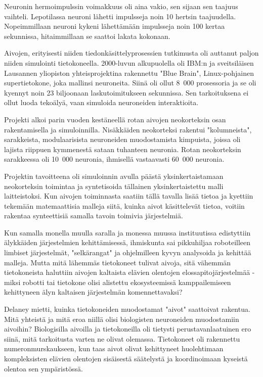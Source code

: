 Neuronin hermoimpulssin voimakkuus oli aina vakio, sen sijaan sen taajuus vaihteli. Lepotilassa neuroni lähetti impulsseja noin 10 hertsin taajuudella. Nopeimmillaan neuroni kykeni lähettämään impulsseja noin 100 kertaa sekunnissa, hitaimmillaan se saattoi lakata kokonaan.


Aivojen, erityisesti niiden tiedonkäsittelyprosessien tutkimusta oli auttanut paljon niiden simulointi tietokoneella. 2000-luvun alkupuolella oli IBM:n ja sveitsiläisen Lausannen yliopiston yhteisprojektina rakennettu "Blue Brain", Linux-pohjainen supertietokone, joka mallinsi neuroneita. Siinä oli ollut 8~000 prosessoria ja se oli kyennyt noin 23 biljoonaan laskutoimitukseen sekunnissa. Sen tarkoituksena ei ollut luoda tekoälyä, vaan simuloida neuroneiden interaktioita.


Projekti alkoi parin vuoden kestäneellä rotan aivojen neokorteksin osan rakentamisella ja simuloinnilla. Nisäkkäiden neokorteksi rakentui "kolumneista", sarakkeista, modulaarisista neuroneiden muodostamista kimpuista, joissa oli lajista riippuen kymmenestä sataan tuhanteen neuronia. Rotan neokorteksin sarakkeessa oli 10~000 neuronia, ihmisellä vastaavasti 60~000 neuronia.


Projektin tavoitteena oli simuloinnin avulla päästä yksinkertaistamaan neokorteksin toimintaa ja syntetisoida tällainen yksinkertaistettu malli laitteistoksi. Kun aivojen toiminnasta saatiin tällä tavalla lisää tietoa ja kyettiin tekemään matemaattisia malleja siitä, kuinka aivot käsittelevät tietoa, voitiin rakentaa synteettisiä samalla tavoin toimivia järjestelmiä.


Kun samalla monella muulla saralla ja monessa muussa instituutissa edistyttiin älykkäiden järjestelmien kehittämisessä, ihmiskunta sai pikkuhiljaa roboteilleen limbiset järjestelmät, "selkärangat" ja ohjelmilleen kyvyn analysoida ja kehittää malleja. Mutta mitä lähemmäs tietokoneet tulivat aivoja, sitä vähemmän tietokoneista haluttiin aivojen kaltaista elävien olentojen elossapitojärjestelmää - miksi robotti tai tietokone olisi alistettu ekosysteemissä kamppailemiseen kehittyneen älyn kaltaisen järjestelmän komennettavaksi?


Delaney mietti, kuinka tietokoneiden muodostamat "aivot" saattoivat rakentua. Mitä yhteistä ja mitä eroa niillä olisi biologisten neuroneiden muodostamiin aivoihin? Biologisilla aivoilla ja tietokoneilla oli tietysti perustavanlaatuinen ero siinä, mitä tarkoitusta varten ne olivat olemassa. Tietokoneet oli rakennettu numeronmurskaukseen, kun taas aivot olivat kehittyneet huolehtimaan kompleksisten elävien olentojen sisäisestä säätelystä ja koordinoimaan kyseistä olentoa sen ympäristössä.


